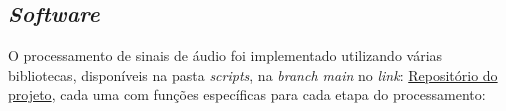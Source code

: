  
\subsection{\textit{Software}}

O processamento de sinais de áudio foi implementado utilizando várias bibliotecas, disponíveis na pasta \textit{scripts}, na \textit{branch main} no \textit{link}: \href{https://github.com/joselitopradomarques/tcc}{Repositório do projeto}, cada uma com funções específicas para cada etapa do processamento: %

